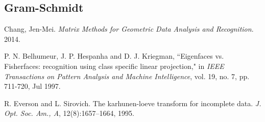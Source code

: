 \subsection{Gram-Schmidt} \label{code:gram_schmidt}

% 


\begin{thebibliography}{10}
    Chang, Jen-Mei. \textit{Matrix Methods for Geometric Data Analysis and Recognition}. 2014.

    P. N. Belhumeur, J. P. Hespanha and D. J. Kriegman, ``Eigenfaces vs. Fisherfaces: recognition using class specific linear projection," in \textit{IEEE Transactions on Pattern Analysis and Machine Intelligence}, vol. 19, no. 7, pp. 711-720, Jul 1997.

    R. Everson and L. Sirovich. The karhunen-loeve transform for incomplete data. \textit{J. Opt. Soc. Am., A}, 12(8):1657–1664, 1995.
\end{thebibliography}


